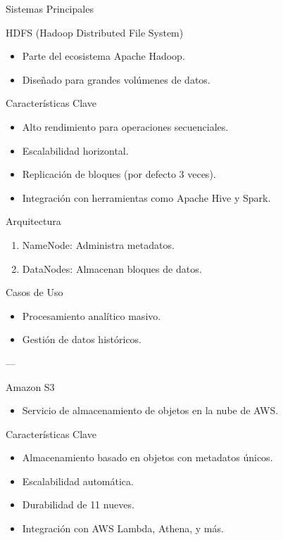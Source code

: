 \documentclass[presentation]{beamer}
\begin{document}
\begin{frame}[label={sec:org317cb5a}]{Sistemas Principales}
\begin{block}{HDFS (Hadoop Distributed File System)}
\begin{itemize}
\item Parte del ecosistema Apache Hadoop.
\item Diseñado para grandes volúmenes de datos.
\end{itemize}

\begin{block}{Características Clave}
\begin{itemize}
\item Alto rendimiento para operaciones secuenciales.
\item Escalabilidad horizontal.
\item Replicación de bloques (por defecto 3 veces).
\item Integración con herramientas como Apache Hive y Spark.
\end{itemize}
\end{block}

\begin{block}{Arquitectura}
\begin{enumerate}
\item \alert{\alert{NameNode:}} Administra metadatos.
\item \alert{\alert{DataNodes:}} Almacenan bloques de datos.
\end{enumerate}
\end{block}

\begin{block}{Casos de Uso}
\begin{itemize}
\item Procesamiento analítico masivo.
\item Gestión de datos históricos.
\end{itemize}

---
\end{block}
\end{block}

\begin{block}{Amazon S3}
\begin{itemize}
\item Servicio de almacenamiento de objetos en la nube de AWS.
\end{itemize}

\begin{block}{Características Clave}
\begin{itemize}
\item Almacenamiento basado en objetos con metadatos únicos.
\item Escalabilidad automática.
\item Durabilidad de \alert{\alert{11 nueves}}.
\item Integración con AWS Lambda, Athena, y más.
\end{itemize}
\end{block}


\end{block}
\end{frame}
\end{document}
